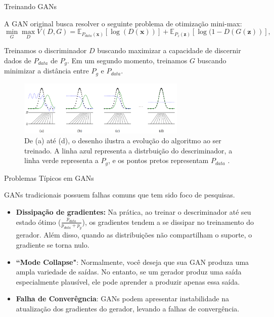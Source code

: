 \documentclass[10pt]{beamer}
\begin{document}
\begin{frame}[fragile]{Treinando GANs}

	A GAN original busca resolver o seguinte problema de otimização mini-max:
	\begin{equation*}
		\min_{G} \max_D V(D,G) =
		\mathbb{E}_{P_{data}(\bm x)}\left[\log{(D(\bm x))}\right]+
		\mathbb{E}_{P_z(\bm z)}\left[\log(1-D(G(\bm z))\right],
	\end{equation*}

	Treinamos o discriminador $D$ buscando maximizar
	a capacidade de discernir dados de $P_{data}$ de $P_g$.
	Em um segundo momento, treinamos $G$ buscando minimizar
	a distância entre $P_g$ e $P_{data}$.

	\begin{figure}[H]
		\centering
		\includegraphics[width=8cm]{Figures/gan-algorithmscheme.png}
		\caption{De (a) até (d), o desenho ilustra a evolução do
			algoritmo ao ser treinado. A linha azul representa a
			distrbuição do descriminador, a linha verde representa
			a $P_g$, e os pontos pretos representam $P_{data}$
			\citep{goodfellow2014}.}
	\end{figure}

\end{frame}

\begin{frame}[fragile]{Problemas Típicos em GANs}

	GANs tradicionais possuem falhas comuns que tem sido foco
	de pesquisas.
	\small

	\begin{itemize}
		\item \textbf{Dissipação de gradientes:} Na prática, ao treinar
		      o descriminador até seu estado ótimo ($\frac{p_{data}}
			      {p_{data} + p_g}$), os gradientes tendem a se dissipar
		      no treinamento do gerador. Além disso, quando as distribuições
		      não compartilham o suporte, o gradiente se torna nulo.

		\item  \textbf{``Mode Collapse"}: Normalmente, você deseja que sua GAN
		      produza uma ampla variedade de saídas. No entanto, se um gerador produz
		      uma saída especialmente plausível, ele pode aprender a produzir apenas
		      essa saída.

		\item \textbf{Falha de Converêgncia}: GANs podem apresentar instabilidade
		      na atualização dos gradientes do gerador, levando a falhas de
		      convergência.
	\end{itemize}

\end{frame}
\end{document}
